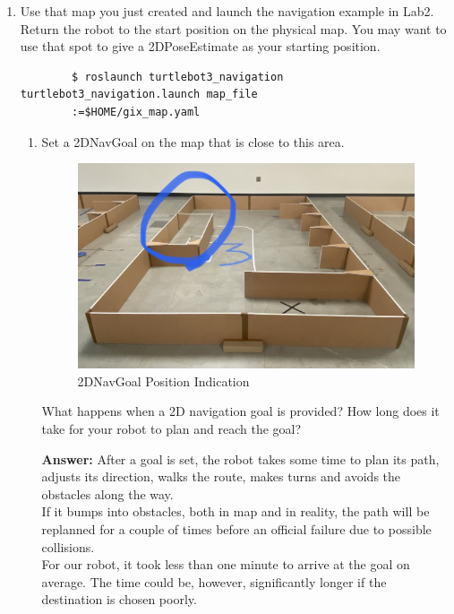 \documentclass[12pt]{article}
\begin{document}
\begin{enumerate}
    \item Use that map you just created and launch the navigation example in Lab2. Return the robot to the start position on the physical map. You may want to use that spot to give a 2DPoseEstimate as your starting position.
    \begin{verbatim}
        $ roslaunch turtlebot3_navigation turtlebot3_navigation.launch map_file
        :=$HOME/gix_map.yaml
    \end{verbatim}
    \begin{enumerate}

        \item Set a 2DNavGoal on the map that is close to this area.
        
        \begin{figure}[H]
        \centering\includegraphics[width=14cm]{images/map2.jpeg}
        \caption{2DNavGoal Position Indication}\vspace{-10pt}
        \end{figure}
        
        What happens when a 2D navigation goal is provided? How long does it take for your robot to plan and reach the goal?

        \textbf{Answer: }After a goal is set, the robot takes some time to plan its path, adjusts its direction, walks the route, makes turns and avoids the obstacles along the way.
        \\If it bumps into obstacles, both in map and in reality, the path will be replanned for a couple of times before an official failure due to possible collisions.
        \\For our robot, it took less than one minute to arrive at the goal on average. The time could be, however, significantly longer if the destination is chosen poorly.


\end{enumerate}
\end{enumerate}
\end{document}
